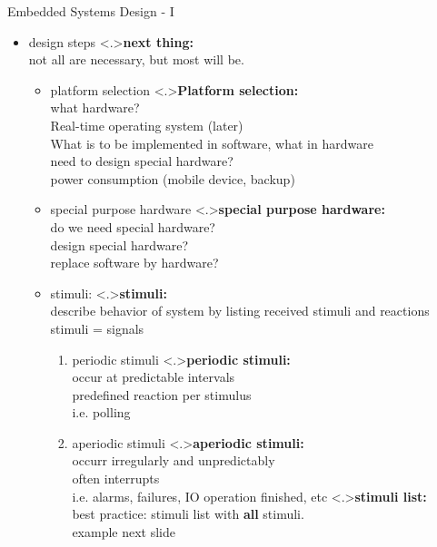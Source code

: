 \documentclass[ngerman={babel}, utf8, bigger, xcolor={table,dvipsnames}, ompress, hyperref={bookmarks,colorlinks}]{beamer}
\begin{document}
\begin{frame}{Embedded Systems Design - I}
	\begin{itemize}
		\item design steps
		\note<.>{\textbf{next thing:}\\ not all are necessary, but most will be.}
		\begin{itemize}
			\item platform selection
			\note<.>{\textbf{Platform selection:}\\ what hardware? \\ Real-time operating system {\tiny (later)}\\ What is to be implemented in software, what in hardware \\ need to design special hardware? \\ power consumption (mobile device, backup)}
			\item special purpose hardware
			\note<.>{\textbf{special purpose hardware:}\\ do we need special hardware? \\ design special hardware? \\ replace software by hardware?}
			\item stimuli:
			\note<.>{\textbf{stimuli:}\\ describe behavior of system by listing received stimuli and reactions \\ stimuli = signals \\}
				\begin{enumerate}
					\item periodic stimuli
					\note<.>{\textbf{periodic stimuli:}\\occur at predictable intervals \\ predefined reaction per stimulus \\ i.e. polling}
					\item aperiodic stimuli
					\note<.>{\textbf{aperiodic stimuli:}\\ occurr irregularly and unpredictably \\ often interrupts \\ i.e. alarms, failures, IO operation finished, etc}
					\note<.>{\textbf{stimuli list:}\\best practice: stimuli list with \textbf{all} stimuli. \\ \vspace*{2em} example next slide}
				\end{enumerate}
		\end{itemize}
	\end{itemize}
\end{frame}
\end{document}
